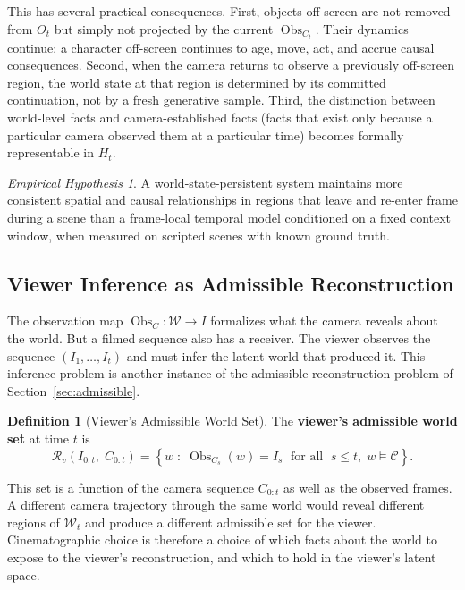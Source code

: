 \documentclass[11pt,a4paper]{article}
\theoremstyle{plain}
\theoremstyle{definition}
\newtheorem{definition}[theorem]{Definition}
\theoremstyle{remark}
\newtheorem{hypothesis}[theorem]{Empirical Hypothesis}
\DeclareMathOperator{\Obs}{Obs}
\begin{document}
This has several practical consequences. First, objects off-screen are not removed from $O_t$ but simply not projected by the current $\Obs_{C_t}$. Their dynamics continue: a character off-screen continues to age, move, act, and accrue causal consequences. Second, when the camera returns to observe a previously off-screen region, the world state at that region is determined by its committed continuation, not by a fresh generative sample. Third, the distinction between world-level facts and camera-established facts (facts that exist only because a particular camera observed them at a particular time) becomes formally representable in $H_t$.

\begin{hypothesis}
\label{hyp:offscreen}
A world-state-persistent system maintains more consistent spatial and causal relationships in regions that leave and re-enter frame during a scene than a frame-local temporal model conditioned on a fixed context window, when measured on scripted scenes with known ground truth.
\end{hypothesis}

\subsection{Viewer Inference as Admissible Reconstruction}

The observation map $\Obs_C : \mathcal{W} \to I$ formalizes what the camera reveals about the world. But a filmed sequence also has a receiver. The viewer observes the sequence $(I_1, \ldots, I_t)$ and must infer the latent world that produced it. This inference problem is another instance of the admissible reconstruction problem of Section~\ref{sec:admissible}.

\begin{definition}[Viewer's Admissible World Set]
The \textbf{viewer's admissible world set} at time $t$ is
\[
\mathcal{R}_v(I_{0:t},\; C_{0:t}) = \left\{ w \;:\; \Obs_{C_s}(w) = I_s \;\text{ for all }\; s \leq t,\; w \models \mathcal{C} \right\}.
\]
\end{definition}

This set is a function of the camera sequence $C_{0:t}$ as well as the observed frames. A different camera trajectory through the same world would reveal different regions of $\mathcal{W}_t$ and produce a different admissible set for the viewer. Cinematographic choice is therefore a choice of which facts about the world to expose to the viewer's reconstruction, and which to hold in the viewer's latent space.
\end{document}
